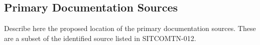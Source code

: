 \subsection{Primary Documentation Sources}

Describe here the proposed location of the primary documentation sources.  These are a subset of the identified source listed in SITCOMTN-012.


